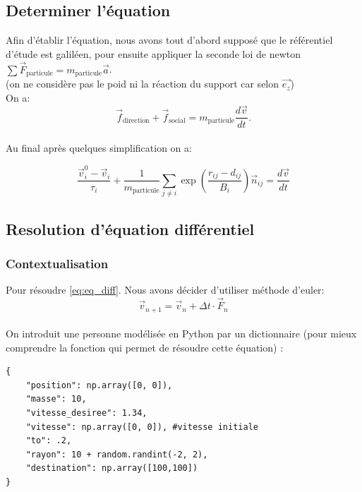 \documentclass[a4paper,12pt]{article}
\begin{document}
\subsection{Determiner l'équation}

\indent Afin d’établir l’équation, nous avons tout d’abord supposé que le référentiel d’étude est galiléen, pour ensuite appliquer la seconde loi de newton $\sum \vec{F}_{\text{particule}} = m_{\text{particule}} \vec{a}$.
\\(on ne considère pas le poid ni la réaction du support car selon $\vec{e_z}$)
\\ On a:
\[
\vec{f}_{\text{direction}} + \vec{f}_{\text{social}} = m_{\text{particule}} \frac{d\vec{v}}{dt}.
\]
\\ Au final après quelques simplification on a:

\begin{equation}
\label{eq:eq_diff}
\frac{\vec{v}_i^0 - \vec{v}_i}{\tau_i} + \frac{1}{m_{\text{particule}}} \sum_{j \neq i}  \exp\left( \frac{r_{ij} - d_{ij}}{B_i} \right) \vec{n}_{ij} = \frac{d\vec{v}}{dt}
\end{equation}

\subsection{Resolution d'équation différentiel}
\subsubsection{Contextualisation}

\indent Pour résoudre \eqref{eq:eq_diff}. Nous avons décider d'utiliser méthode d'euler:
\[
\vec{v}_{n+1} = \vec{v}_n + \Delta t \cdot \vec{F}_n
\]
\\ On introduit une personne modélisée en Python par un dictionnaire (pour mieux comprendre  la fonction qui permet de résoudre cette équation) :

\begin{verbatim}
{
	"position": np.array([0, 0]),
	"masse": 10,
	"vitesse_desiree": 1.34, 
	"vitesse": np.array([0, 0]), #vitesse initiale
	"to": .2,
	"rayon": 10 + random.randint(-2, 2),
	"destination": np.array([100,100])
} 
\end{verbatim}
\end{document}
